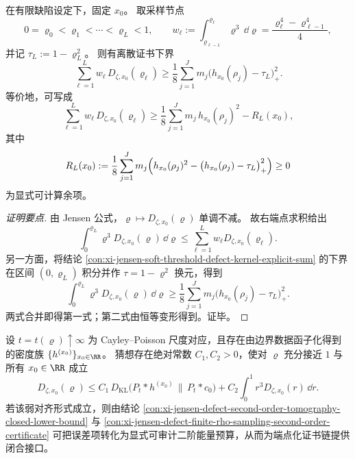 \begin{conclusion}\label{con:xi-jensen-defect-finite-rho-sampling-second-order-certificate}
在有限缺陷设定下，固定 \(x_0\)。
取采样节点
\[
0=\varrho_0<\varrho_1<\cdots<\varrho_L<1,\qquad
w_\ell:=\int_{\varrho_{\ell-1}}^{\varrho_\ell}\varrho^3\,\dd\varrho
=\frac{\varrho_\ell^4-\varrho_{\ell-1}^4}{4},
\]
并记 \(\tau_L:=1-\varrho_L^2\)。
则有离散证书下界
\[
\sum_{\ell=1}^{L}w_\ell\,D_{\zeta,x_0}(\varrho_\ell)
\ge
\frac18\sum_{j=1}^{J}m_j\bigl(h_{x_0}(\rho_j)-\tau_L\bigr)_+^2.
\]
等价地，可写成
\[
\sum_{\ell=1}^{L}w_\ell\,D_{\zeta,x_0}(\varrho_\ell)
\ge
\frac18\sum_{j=1}^{J}m_j\,h_{x_0}(\rho_j)^2-R_L(x_0),
\]
其中
\[
R_L(x_0):=
\frac18\sum_{j=1}^{J}m_j
\Bigl(h_{x_0}(\rho_j)^2-\bigl(h_{x_0}(\rho_j)-\tau_L\bigr)_+^2\Bigr)\ge 0
\]
为显式可计算余项。
\end{conclusion}
\begin{proof}[证明要点]
由 Jensen 公式，\(\varrho\mapsto D_{\zeta,x_0}(\varrho)\) 单调不减。
故右端点求积给出
\[
\int_0^{\varrho_L}\varrho^3D_{\zeta,x_0}(\varrho)\,\dd\varrho
\le
\sum_{\ell=1}^{L}w_\ell D_{\zeta,x_0}(\varrho_\ell).
\]
另一方面，将结论 \ref{con:xi-jensen-soft-threshold-defect-kernel-explicit-sum} 的下界在区间 \((0,\varrho_L)\) 积分并作 \(\tau=1-\varrho^2\) 换元，得到
\[
\int_0^{\varrho_L}\varrho^3D_{\zeta,x_0}(\varrho)\,\dd\varrho
\ge
\frac18\sum_{j=1}^{J}m_j\bigl(h_{x_0}(\rho_j)-\tau_L\bigr)_+^2.
\]
两式合并即得第一式；第二式由恒等变形得到。证毕。
\end{proof}

\begin{conclusion}\label{con:xi-endpoint-defect-poisson-kl-second-order-energy-dominant-alignment}
设 \(t=t(\varrho)\uparrow\infty\) 为 Cayley--Poisson 尺度对应，且存在由边界数据函子化得到的密度族 \(\{h^{(x_0)}\}_{x_0\in\RR}\)。
猜想存在绝对常数 \(C_1,C_2>0\)，使对 \(\varrho\) 充分接近 \(1\) 与所有 \(x_0\in\RR\) 成立
\[
D_{\zeta,x_0}(\varrho)
\le
C_1\,D_{\mathrm{KL}}\!\bigl(P_t*h^{(x_0)}\,\big\|\,P_t*c_0\bigr)
+C_2\!\int_0^1 r^3D_{\zeta,x_0}(r)\,\dd r.
\]
若该弱对齐形式成立，则由结论
\ref{con:xi-jensen-defect-second-order-tomography-closed-lower-bound}
与 \ref{con:xi-jensen-defect-finite-rho-sampling-second-order-certificate}
可把误差项转化为显式可审计二阶能量预算，从而为端点化证书链提供闭合接口。
\end{conclusion}
